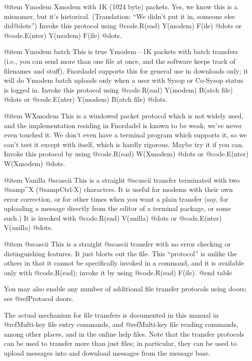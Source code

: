 @item Ymodem
Xmodem with 1K (1024 byte) packets.  Yes, we
know this is a misnomer, but it's historical.
(Translation: ``We didn't put it in, someone
else did@dots{}'')  Invoke this protocol using
@code{.R(ead) Y(modem) F(ile) @dots{}} or @code{.E(nter)
Y(modem) F(ile) @dots{}}.

@item Ymodem batch
This is true Ymodem---1K packets with
batch transfers (i.e., you can send more than
one file at once, and the software keeps track
of filenames and stuff).  Fnordadel supports
this for general use in downloads only; it
will do Ymodem batch uploads only when a user
with Sysop or Co-Sysop status is logged in.  Invoke this
protocol using @code{.R(ead) Y(modem) B(atch file) @dots{}}
or @code{.E(nter) Y(modem) B(atch file) @dots{}}.

@item WXmodem
This is a windowed packet protocol which is
not widely used, and the implementation residing
in Fnordadel is known to be weak; we've never
even touched it.  We don't even have a terminal
program which supports it, so we can't test it
except with itself, which is hardly rigorous.
Maybe try it if you can.  Invoke this protocol
by using @code{.R(ead) W(Xmodem) @dots{}} or @code{.E(nter)
W(Xmodem) @dots{}}.

@item Vanilla @sc{ascii}
This is a straight @sc{ascii} transfer terminated with two @samp{^X}
(@samp{Ctrl-X}) characters.  It is useful for modems with their own error
correction, or for other times when you want a plain transfer (say, for
uploading a message directly from the editor of a terminal package, or
some such.)  It is invoked with @code{.R(ead) V(anilla) @dots{}} or
@code{.E(nter) V(anilla) @dots{}}.

@item @sc{ascii}
This is a straight @sc{ascii} transfer with no error
checking or distinguishing features.  It just
blorts out the file.  This ``protocol'' is unlike the
others in that it cannot be specifically invoked in
a command, and it is available only with @code{.R(ead)};
invoke it by using @code{.R(ead) F(ile)}.
@end table

You may also enable any number of additional file transfer
protocols using doors; see @ref{Protocol doors}.

The actual mechanism for file transfers is documented in this manual in
@ref{Multi-key file entry commands}, and @ref{Multi-key file reading commands},
among other places, and in the online help files.  Note that the transfer
protocols can be used to transfer more than just files; in particular, they
can be used to upload messages into and download messages from the message
base.

